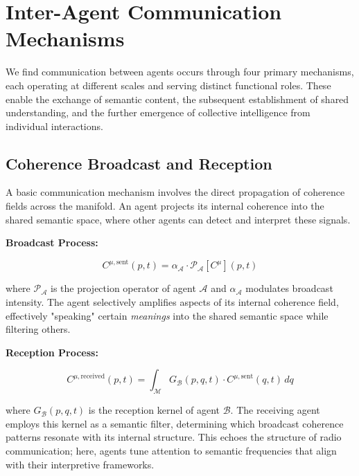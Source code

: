
\section{Inter-Agent Communication Mechanisms}
\label{14.3:inter_agent_communication_mechanisms}

We find communication between agents occurs through four primary mechanisms, each operating at different scales and serving distinct functional roles. These enable the exchange of semantic content, the subsequent establishment of shared understanding, and the further emergence of collective intelligence from individual interactions.


\subsection{Coherence Broadcast and Reception}
\label{14.3.1:coherence_broadcast_and_reception}

A basic communication mechanism involves the direct propagation of coherence fields across the manifold. An agent projects its internal coherence into the shared semantic space, where other agents can detect and interpret these signals.

\textbf{Broadcast Process:}

\begin{equation}
C^{\mu, \mathrm{sent}}(p,t) = \alpha_{\mathcal{A}} \cdot \mathcal{P}_{\mathcal{A}}[C^\mu](p,t)
\end{equation}

where \(\mathcal{P}_{\mathcal{A}}\) is the projection operator of agent \(\mathcal{A}\) and \(\alpha_{\mathcal{A}}\) modulates broadcast intensity. The agent selectively amplifies aspects of its internal coherence field, effectively "speaking" certain \textit{meanings} into the shared semantic space while filtering others.

\textbf{Reception Process:}

\begin{equation}
C^{\mu, \mathrm{received}}(p,t) = \int_{\mathcal{M}} G_{\mathcal{B}}(p,q,t) \cdot C^{\mu, \mathrm{sent}}(q,t) \, dq
\end{equation}

where \(G_{\mathcal{B}}(p,q,t)\) is the reception kernel of agent \(\mathcal{B}\). The receiving agent employs this kernel as a semantic filter, determining which broadcast coherence patterns resonate with its internal structure. This echoes the structure of radio communication; here, agents tune attention to semantic frequencies that align with their interpretive frameworks.


